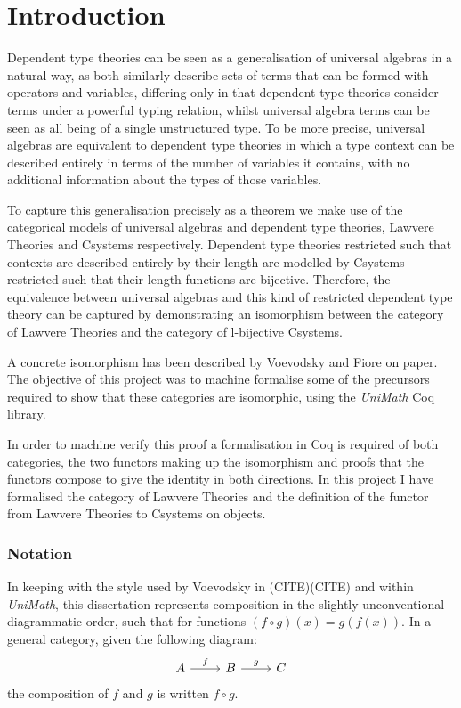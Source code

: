 \chapter{Introduction}
Dependent type theories can be seen as a generalisation of universal algebras in
a natural way, as both similarly describe sets of terms that can be formed with
operators and variables, differing only in that dependent type theories consider
terms under a powerful typing relation, whilst universal algebra terms can be
seen as all being of a single unstructured type. To be more precise, universal
algebras are equivalent to dependent type theories in which a type context can
be described entirely in terms of the number of variables it contains, with no
additional information about the types of those variables.

To capture this generalisation precisely as a theorem we make use of the
categorical models of universal algebras and dependent type theories, Lawvere
Theories and Csystems respectively. Dependent type theories restricted such that
contexts are described entirely by their length are modelled by Csystems
restricted such that their length functions are bijective. Therefore, the
equivalence between universal algebras and this kind of restricted dependent
type theory can be captured by demonstrating an isomorphism between the category
of Lawvere Theories and the category of l-bijective Csystems.

A concrete isomorphism has been described by Voevodsky and Fiore on paper. The
objective of this project was to machine formalise some of the precursors
required to show that these categories are isomorphic, using the
\textit{UniMath} Coq library. 

In order to machine verify this proof a formalisation in Coq is required of
both categories, the two functors making up the isomorphism and proofs that the
functors compose to give the identity in both directions. In this project I have
formalised the category of Lawvere Theories and the definition of the functor
from Lawvere Theories to Csystems on objects.

\subsection*{Notation}
In keeping with the style used by Voevodsky in (CITE)(CITE) and within
\textit{UniMath}, this dissertation represents composition in the slightly
unconventional diagrammatic order, such that for functions $(f\circ g)(x) =
g(f(x))$. In a general category, given the following diagram:
\[
\begin{tikzcd}
    A\ar[r,"f"]&B\ar[r,"g"]&C
\end{tikzcd}
\]
the composition of $f$ and $g$ is written $f\circ g$.